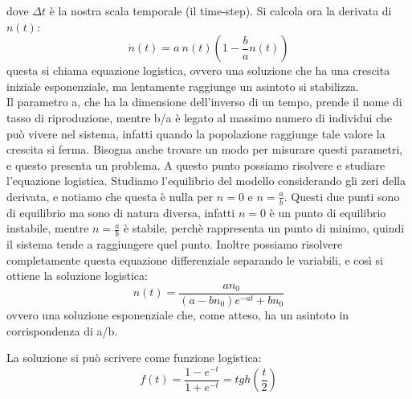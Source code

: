 \documentclass[12pt]{article}
\begin{document}
dove $\Delta t$ è la nostra scala temporale (il time-step). Si calcola ora la derivata di $n(t)$:
\begin{equation}
	\dot{n}(t) = a \ n(t)\left(1- \frac{b}{a}n(t) \right)
\end{equation}
questa si chiama equazione logistica, ovvero una soluzione che ha una crescita iniziale esponenziale, ma lentamente raggiunge un asintoto  si stabilizza. \\
Il parametro a, che ha la dimensione dell'inverso di un tempo, prende il nome di tasso di riproduzione, mentre b/a è legato al massimo numero di individui che può vivere nel sistema, infatti quando la popolazione raggiunge tale valore la crescita si ferma. Bisogna anche trovare un modo per misurare questi parametri, e questo presenta un problema. A questo punto possiamo risolvere e studiare l'equazione logistica. Studiamo l'equilibrio del modello considerando gli zeri della derivata, e notiamo che questa è nulla per $n = 0$ e $n = \frac{a}{b}$. Questi due punti sono di equilibrio ma sono di natura diversa, infatti $n=0$ è un punto di equilibrio instabile, mentre $n = \frac{a}{b}$ è stabile, perchè rappresenta un punto di minimo, quindi il sistema tende a raggiungere quel punto. Inoltre possiamo risolvere completamente questa equazione differenziale separando le variabili, e così si ottiene la soluzione logistica: 
\begin{equation}
	n(t) = \frac{an_0}{(a-bn_0)e^{-at}+bn_0}
\end{equation}
ovvero una soluzione esponenziale che, come atteso, ha un asintoto in corrispondenza di a/b.
\begin{center}
\end{center}
 La soluzione si può scrivere come funzione logistica:
\begin{equation}
f(t) = \frac{1-e^{-t}}{1+e^{-t}} = tgh\left(\frac{t}{2}\right)
\end{equation}
\begin{center}
\end{center}
\end{document}
